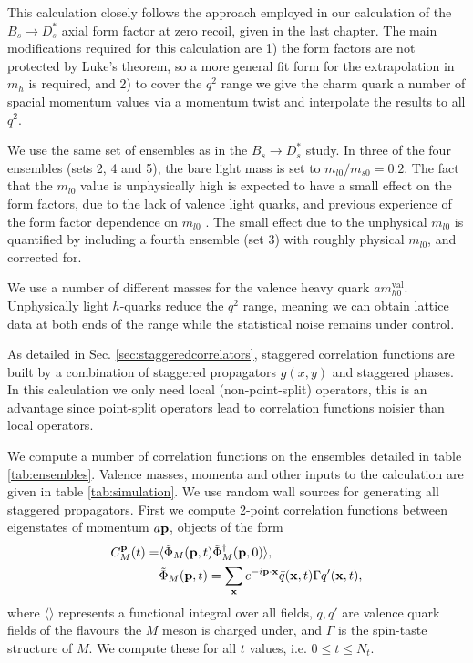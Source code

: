 This calculation closely follows the approach employed in our calculation of the $B_s\to D_s^*$ axial form factor at zero recoil, given in the last chapter. The main modifications required for this calculation are 1) the form factors are not protected by Luke's theorem, so a more general fit form for the extrapolation in $m_h$ is required, and 2) to cover the $q^2$ range we give the charm quark a number of spacial momentum values via a momentum twist and interpolate the results to all $q^2$.

We use the same set of ensembles as in the $B_s\to D_s^*$ study. In three of the four ensembles (sets 2, 4 and 5), the bare light mass is set to $m_{l0}/m_{s0} = 0.2$. The fact that the $m_{l0}$ value is unphysically high is expected to have a small effect on the form factors, due to the lack of valence light quarks, and previous experience of the form factor dependence on $m_{l0}$ \cite{Monahan:2017uby}. The small effect due to the unphysical $m_{l0}$ is quantified by including a fourth ensemble (set 3) with roughly physical $m_{l0}$, and corrected for. 

We use a number of different masses for the valence heavy quark $am_{h0}^{\text{val}}$. Unphysically light $h$-quarks reduce the $q^2$ range, meaning we can obtain lattice data at both ends of the range while the statistical noise remains under control.

As detailed in Sec. \ref{sec:staggeredcorrelators}, staggered correlation functions are built by a combination of staggered propagators $g(x,y)$ and staggered phases. In this calculation we only need local (non-point-split) operators, this is an advantage since point-split operators lead to correlation functions noisier than local operators.

We compute a number of correlation functions on the ensembles detailed in table \ref{tab:ensembles}. Valence masses, momenta and other inputs to the calculation are given in table \ref{tab:simulation}. We use random wall sources for generating all staggered propagators. First we compute 2-point correlation functions between eigenstates of momentum $a{\bf{p}}$, objects of the form
\begin{align}
  C^{{\bf{p}}}_{M}(t) =& \langle \tilde{\Phi}_M ({\bf{p}},t) \tilde{\Phi}_M^{\dagger}({\bf{p}},0) \rangle, \\ 
  &\tilde{\Phi}_M({\bf{p}},t) = \sum_{{\bf{x}}} e^{-i\bf{p}\cdot \bf{x}} \bar{q}({\bf{x}},t) \Gamma q'({\bf{x}},t), \nonumber
\end{align}
where $\langle \rangle$ represents a functional integral over all fields, $q,q'$ are valence quark fields of the flavours the $M$ meson is charged under, and $\Gamma$ is the spin-taste structure of $M$. We compute these for all $t$ values, i.e. $0\leq t \leq N_t$.

